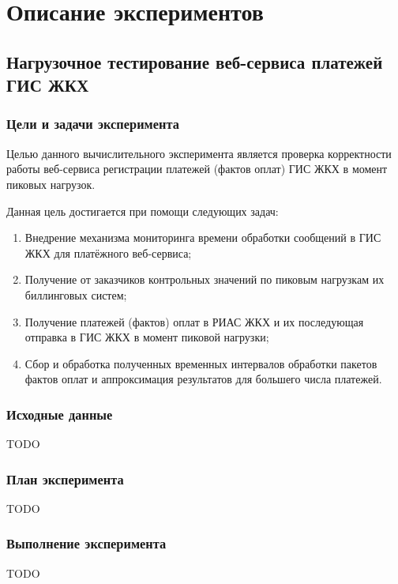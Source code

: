 \section{Описание экспериментов}

\subsection{Нагрузочное тестирование веб-сервиса платежей ГИС ЖКХ}

\subsubsection*{Цели и задачи эксперимента}

Целью данного вычислительного эксперимента является проверка корректности работы веб-сервиса регистрации платежей (фактов оплат) ГИС ЖКХ в момент пиковых нагрузок.

Данная цель достигается при помощи следующих задач:
\begin{enumerate}
	\item Внедрение механизма мониторинга времени обработки сообщений в ГИС ЖКХ для платёжного веб-сервиса;
	\item Получение от заказчиков контрольных значений по пиковым нагрузкам их биллинговых систем;
	\item Получение платежей (фактов) оплат в РИАС ЖКХ и их последующая отправка в ГИС ЖКХ в момент пиковой нагрузки;
	\item Сбор и обработка полученных временных интервалов обработки пакетов фактов оплат и аппроксимация результатов для большего числа платежей.
\end{enumerate}

\subsubsection*{Исходные данные}

TODO

\subsubsection*{План эксперимента}

TODO

\subsubsection*{Выполнение эксперимента}

TODO

